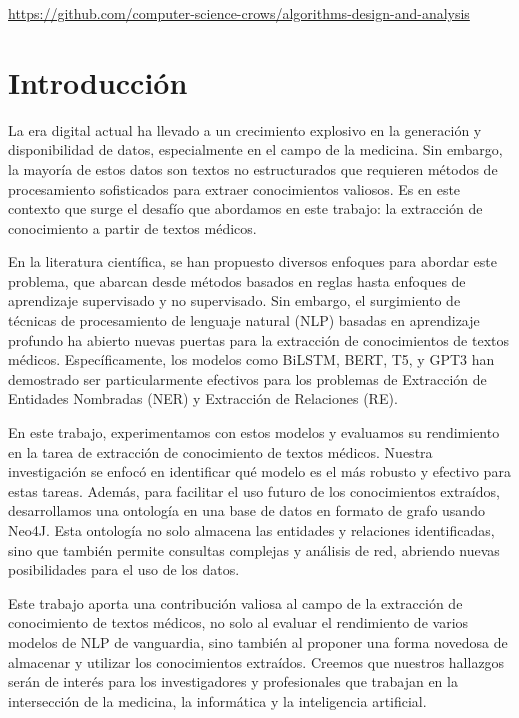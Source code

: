 \documentclass[10pt]{article} %
\begin{document}
	\begin{center}
		\href{https://github.com/computer-science-crows/algorithms-design-and-analysis}{https://github.com/computer-science-crows/algorithms-design-and-analysis}
	\end{center}

	\section{Introducci\'on}
	
	La era digital actual ha llevado a un crecimiento explosivo en la generación y disponibilidad de datos, especialmente en el campo de la medicina. Sin embargo, la mayoría de estos datos son textos no estructurados que requieren métodos de procesamiento sofisticados para extraer conocimientos valiosos. Es en este contexto que surge el desafío que abordamos en este trabajo: la extracción de conocimiento a partir de textos médicos.
	
	En la literatura científica, se han propuesto diversos enfoques para abordar este problema, que abarcan desde métodos basados en reglas hasta enfoques de aprendizaje supervisado y no supervisado. Sin embargo, el surgimiento de técnicas de procesamiento de lenguaje natural (NLP) basadas en aprendizaje profundo ha abierto nuevas puertas para la extracción de conocimientos de textos médicos. Específicamente, los modelos como BiLSTM, BERT, T5, y GPT3 han demostrado ser particularmente efectivos para los problemas de Extracción de Entidades Nombradas (NER) y Extracción de Relaciones (RE). 
	
	En este trabajo, experimentamos con estos modelos y evaluamos su rendimiento en la tarea de extracción de conocimiento de textos médicos. Nuestra investigación se enfocó en identificar qué modelo es el más robusto y efectivo para estas tareas. Además, para facilitar el uso futuro de los conocimientos extraídos, desarrollamos una ontología en una base de datos en formato de grafo usando Neo4J. Esta ontología no solo almacena las entidades y relaciones identificadas, sino que también permite consultas complejas y análisis de red, abriendo nuevas posibilidades para el uso de los datos.
	
	Este trabajo aporta una contribución valiosa al campo de la extracción de conocimiento de textos médicos, no solo al evaluar el rendimiento de varios modelos de NLP de vanguardia, sino también al proponer una forma novedosa de almacenar y utilizar los conocimientos extraídos. Creemos que nuestros hallazgos serán de interés para los investigadores y profesionales que trabajan en la intersección de la medicina, la informática y la inteligencia artificial.
	
\end{document}
